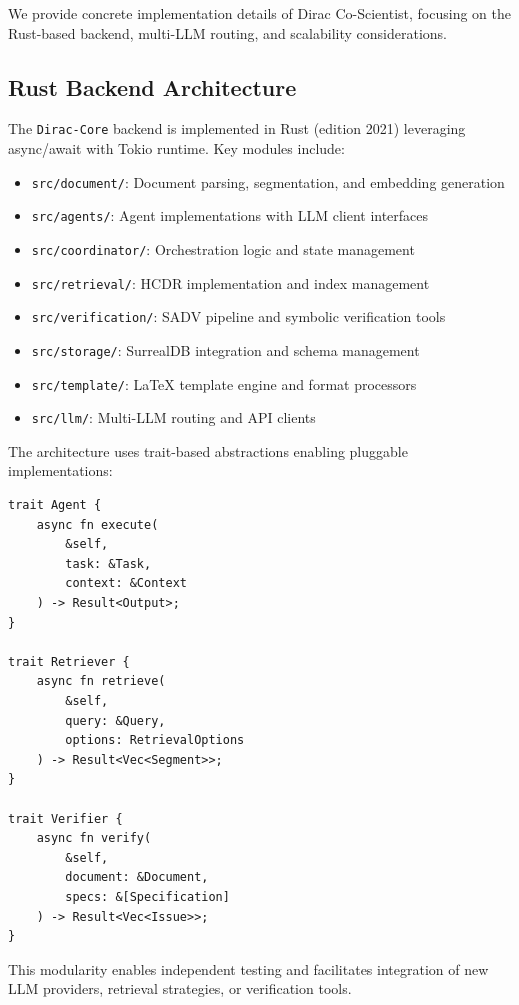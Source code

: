\documentclass{ieeeaccess}
\begin{document}
We provide concrete implementation details of Dirac Co-Scientist, focusing on the Rust-based backend, multi-LLM routing, and scalability considerations.

\subsection{Rust Backend Architecture}

The \texttt{Dirac-Core} backend is implemented in Rust (edition 2021) leveraging async/await with Tokio runtime. Key modules include:

\begin{itemize}
\item \texttt{src/document/}: Document parsing, segmentation, and embedding generation
\item \texttt{src/agents/}: Agent implementations with LLM client interfaces
\item \texttt{src/coordinator/}: Orchestration logic and state management
\item \texttt{src/retrieval/}: HCDR implementation and index management
\item \texttt{src/verification/}: SADV pipeline and symbolic verification tools
\item \texttt{src/storage/}: SurrealDB integration and schema management
\item \texttt{src/template/}: LaTeX template engine and format processors
\item \texttt{src/llm/}: Multi-LLM routing and API clients
\end{itemize}

The architecture uses trait-based abstractions enabling pluggable implementations:

\begin{lstlisting}[style=codestyle, float=!t, caption={Trait-based abstractions for pluggable components}, label=lst:traits]
trait Agent {
    async fn execute(
        &self, 
        task: &Task, 
        context: &Context
    ) -> Result<Output>;
}

trait Retriever {
    async fn retrieve(
        &self, 
        query: &Query, 
        options: RetrievalOptions
    ) -> Result<Vec<Segment>>;
}

trait Verifier {
    async fn verify(
        &self, 
        document: &Document, 
        specs: &[Specification]
    ) -> Result<Vec<Issue>>;
}
\end{lstlisting}

This modularity enables independent testing and facilitates integration of new LLM providers, retrieval strategies, or verification tools.
\end{document}

